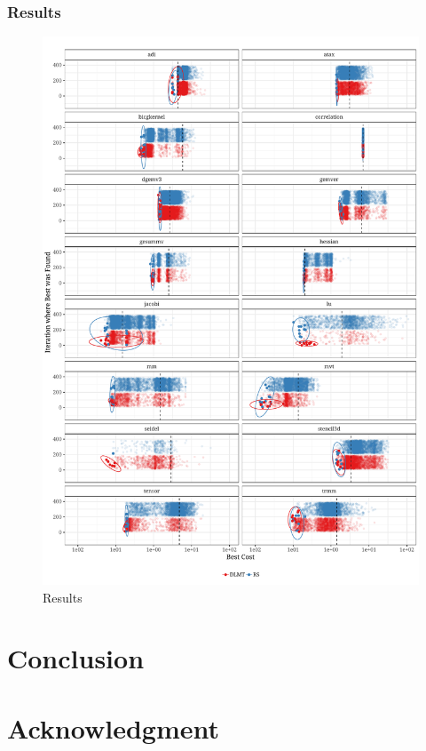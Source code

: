 \documentclass[conference]{IEEEtran}
\begin{document}
\subsubsection{Results}
\label{sec:org8952908}
\begin{center}
\begin{figure}[p]
\centering
\includegraphics[width=.9\textwidth]{./img/iteration_best_comparison.pdf}
\caption{Results}
\end{figure}
\end{center}
\clearpage
\section{Conclusion}
\label{sec:org706a5b8}
\section*{Acknowledgment}
\label{sec:org8e8798d}


\end{document}
